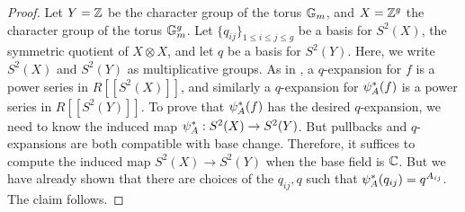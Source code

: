 \documentclass{amsart}
\begin{document}
\begin{proof}
  Let $Y = \mathbb{Z}$ be the character group of the torus $\mathbb{G}_m$, and $X = \mathbb{Z}^g$ the character group of the torus $\mathbb{G}_m^g$. Let $\{ q_{ij}\}_{1 \leq i \leq j \leq g}$ be a basis for $S^2(X)$, the symmetric quotient of $X \otimes X$, and let $q$ be a basis for $S^2(Y)$. Here, we write $S^2(X)$ and $S^2(Y)$ as multiplicative groups. As in \cite[Section V.1]{faltings1990degeneration}, a $q$-expansion for $f$ is a power series in $R[[S^2(X)]]$, and similarly a $q$-expansion for $\psi_{A}^*(f)$ is a power series in $R[[S^2(Y)]]$. To prove that $\psi_{A}^*(f)$ has the desired $q$-expansion, we need to know the induced map $\psi_{A}^*: S^2(X) \to S^2(Y)$. But pullbacks and $q$-expansions are both compatible with base change. Therefore, it suffices to compute the induced map $S^2(X) \to S^2(Y)$ when the base field is $\mathbb{C}$. But we have already shown that there are choices of the $q_{ij}, q$ such that $\psi_{A}^*(q_{ij}) = q^{A_{ij}}$. The claim follows.


\end{proof}
\end{document}
